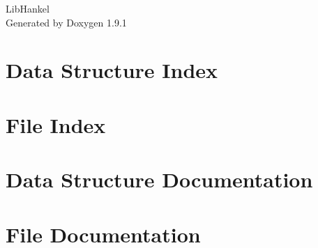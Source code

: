 \let\mypdfximage\pdfximage\def\pdfximage{\immediate\mypdfximage}\documentclass[twoside]{book}
\newcommand{\+}{\discretionary{\mbox{\scriptsize$\hookleftarrow$}}{}{}}
\newcommand{\clearemptydoublepage}{%
  \newpage{\pagestyle{empty}\cleardoublepage}%
}
\begin{document}
\raggedbottom

\hypersetup{pageanchor=false,
             bookmarksnumbered=true,
             pdfencoding=unicode
            }
\begin{titlepage}
\vspace*{7cm}
\begin{center}%
{\Large Lib\+Hankel }\\
\vspace*{1cm}
{\large Generated by Doxygen 1.9.1}\\
\end{center}
\end{titlepage}
\clearemptydoublepage
{}
\tableofcontents
\clearemptydoublepage
{}
\hypersetup{pageanchor=true}

\chapter{Data Structure Index}

\chapter{File Index}

\chapter{Data Structure Documentation}





\chapter{File Documentation}









\backmatter
\newpage
{}
\clearemptydoublepage
{}
\printindex
\end{document}
